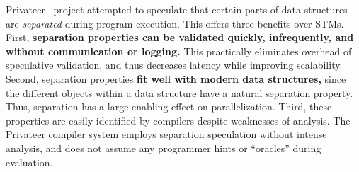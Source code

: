 Privateer~\cite{johnson:12:pldi:short} project attempted to speculate that
certain parts of data structures are {\em separated} during program
execution.  This offers three benefits over STMs.
First, {\bf separation properties can be validated quickly, infrequently,
and without communication or logging.}  This practically eliminates
overhead of speculative validation, and thus decreases latency while
improving scalability.  Second, separation properties {\bf fit well with modern data
structures,} since the different objects within a data structure have a
natural separation property.  Thus, separation has a
large enabling effect on parallelization.  Third,
these properties are easily identified by compilers despite
weaknesses of analysis.  The Privateer compiler system
employs separation speculation without intense analysis, and
does not assume any programmer hints or ``oracles'' during evaluation.







